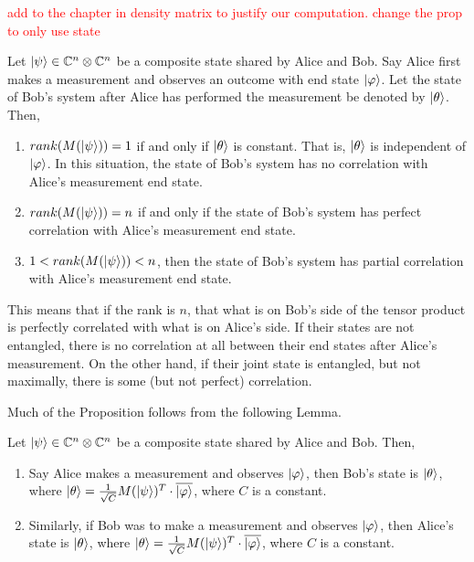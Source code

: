 \textcolor{red}{add to the chapter in density matrix to justify our computation. change the prop to only use state}
\begin{prop}
\label{entanglement-rank}
Let $\ket{\psi} \in \mathbb{C}^n \otimes \mathbb{C}^{n}$ be a composite state shared by Alice and Bob. Say Alice first makes a measurement and observes an outcome with end state $\ket{\varphi}$. Let the state of Bob's system after Alice has performed the measurement be denoted by $\ket{\theta}$. Then,
\begin{enumerate}
    \item $rank(M(\ket{\psi}))=1$ if and only if $\ket{\theta}$ is constant.  That is, $\ket{\theta}$ is independent of $\ket{\varphi}$. In this situation, the state of Bob's system has no correlation with Alice's measurement end state.
    \item $rank(M(\ket{\psi}))=n$ if and only if the state of Bob's system has perfect correlation with Alice's measurement end state.
    \item $1<rank(M(\ket{\psi}))<n$, then the state of Bob's system has partial correlation with Alice's measurement end state.
\end{enumerate}
\end{prop}

This means that if the rank is $n$, that what is on Bob's side of the tensor product is perfectly correlated with what is on Alice's side.  If their states are not entangled, there is no correlation at all between their end states after Alice's measurement.  On the other hand, if their joint state is entangled, but not maximally, there is some (but not perfect) correlation.  

Much of the Proposition follows from the following Lemma.  




\begin{lemma}
\label{end state lemma}
Let $\ket{\psi} \in \mathbb{C}^n \otimes \mathbb{C}^{n}$ be a composite state shared by Alice and Bob.  Then,
\begin{enumerate}
\item Say Alice makes a measurement and observes $\ket{\varphi}$, then Bob's state is $\ket{\theta}$, where $\ket{\theta}=\frac{1}{\sqrt{C}}M(\ket{\psi})^T \cdot \overline{\ket{\varphi}}$, where $C$ is a constant.
\item Similarly, if Bob was to make a measurement and observes $\ket{\varphi}$, then Alice's state is $\ket{\theta}$, where $\ket{\theta}=\frac{1}{\sqrt{C}}M(\ket{\psi})^T\cdot \overline{\ket{\varphi}}$, where $C$ is a constant.\\

\end{enumerate}
\end{lemma}

